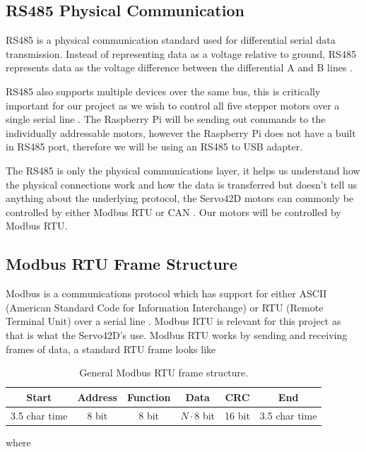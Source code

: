 \subsection{RS485 Physical Communication}
RS485 is a physical communication standard used for differential serial data transmission.
Instead of representing data as a voltage relative to ground, RS485 represents data as the voltage difference between the differential A and B lines \cite{RS485DesignGuide}.

RS485 also supports multiple devices over the same bus, this is critically important for our project as we wish to control all five stepper motors over a single serial line \cite{RS485DesignGuide}.
The Raspberry Pi will be sending out commands to the individually addressable motors, however the Raspberry Pi does not have a built in RS485 port, therefore we will be using an RS485 to USB adapter.

The RS485 is only the physical communications layer, it helps us understand how the physical connections work and how the data is transferred but doesn't tell us anything about the underlying protocol, the Servo42D motors can commonly be controlled by either Modbus RTU or CAN \cite{Makerbase}.
Our motors will be controlled by Modbus RTU.

\subsection{Modbus RTU Frame Structure}
Modbus is a communications protocol which has support for either ASCII (American Standard Code for Information Interchange) or RTU (Remote Terminal Unit) over a serial line \cite{ModbusSerialLine}. Modbus RTU is relevant for this project as that is what the Servo42D's use.
Modbus RTU works by sending and receiving frames of data, a standard RTU frame looks like
\begin{table}[H]
    \centering
    \caption{General Modbus RTU frame structure.}
    \label{tab:modbus_rtu_frame}
    \begin{tabular}{|c|c|c|c|c|c|}
        \hline
        Start & Address & Function & Data & CRC & End \\
        \hline
        3.5 char time & 8 bit & 8 bit & \(N \cdot 8\) bit & 16 bit & 3.5 char time \\
        \hline
    \end{tabular}
\end{table}

where


